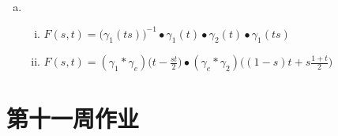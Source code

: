 \documentclass[a4paper,UTF8,fontset=windows]{ctexart}
\begin{document}
\begin{enumerate}[(1)]
\begin{enumerate}[(a)]
    \item
    \begin{enumerate}[(i)]
    \item
    $F(s,t)=\big(\gamma_1(ts)\big)^{-1}\bullet\gamma_1(t)\bullet\gamma_2(t)\bullet\gamma_1(ts)$
    
    \item
    $F(s,t)=(\gamma_1*\gamma_e)\big(t-\frac{st}{2}\big)\bullet(\gamma_e*\gamma_2)\big((1-s)t+s\frac{1+t}{2}\big)$
    \end{enumerate}
    \end{enumerate}
\end{enumerate}

\section{第十一周作业}
\end{document}
